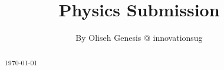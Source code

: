 \documentclass[]{article}
\title{Physics Submission}
\author{ By Oliseh Genesis @ innovationsug}
\begin{document}
\maketitle

\begin{abstract}
\today
\end{abstract}

\section{}
\end{document}
